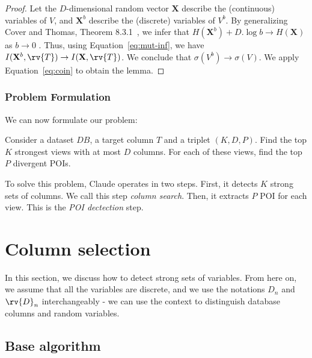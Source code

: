\begin{proof}
    Let the $D$-dimensional random vector $\mathbf{X}$ describe the
    (continuous) variables of $V$, and $\mathbf{X}^b$ describe the (discrete)
    variables of $V^b$. By generalizing Cover and Thomas, Theorem
    8.3.1~\cite{cover2012elements}, we infer that $H(\mathbf{X}^b) + D.\log{b}
    \to H(\mathbf{X})$ as $b \to 0$ .  Thus, using Equation~\ref{eq:mut-inf},
    we have $I(\mathbf{X}^b, \rv{T}) \to I(\mathbf{X}, \rv{T})$. We conclude
    that $\sigma(V^b) \to \sigma(V)$. We apply Equation~\ref{eq:coin} to obtain
    the lemma.
\end{proof}

\subsubsection{Problem Formulation}

We can now formulate our problem:
\begin{problem}
Consider a dataset $DB$, a target column $T$ and a triplet $(K, D, P)$. Find
the top $K$ strongest views with at most $D$ columns. For each of these
views, find the top $P$ divergent POIs.
\end{problem}
To solve this problem, Claude operates in two steps. First, it detects $K$
strong sets of columns.  We call this step \emph{column search}.  Then, it
extracts $P$ POI for each view. This is the \emph{POI dectection} step.















\section{Column selection}
\label{sec:column}

In this section, we discuss how to detect strong sets of variables. From
here on, we assume that all the variables are discrete, and we use the
notations $D_n$ and $\rv{D}_n$ interchangeably - we can use the context to
distinguish database columns and random variables.

\subsection{Base algorithm}

